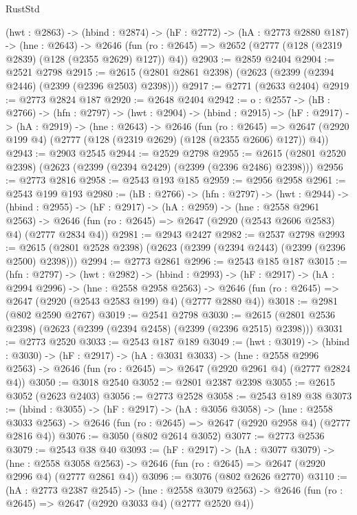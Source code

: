 \begin{lexlean}{RustStd}
\begin{coremodule}
{\begin{coremodule}
{{{{{  (hwt : @2863) ->
  (hbind : @2874) ->
  (hF : @2772) ->
  (hA : @2773 @2880 @187) ->
  (hne : @2643) ->
  @2646 (fun (ro : @2645) => @2652 (@2777 (@128 (@2319 @2839) (@128 (@2355 @2629) @127)) @4))
@2903 := @2859 @2404
@2904 := @2521 @2798
@2915 := @2615 (@2801 @2861 @2398) (@2623 (@2399 (@2394 @2446) (@2399 (@2396 @2503) @2398)))
@2917 := @2771 (@2633 @2404)
@2919 := @2773 @2824 @187
@2920 := @2648 @2404
@2942 := {o : @2557} ->
  (hB : @2766) ->
  (hfn : @2797) ->
  (hwt : @2904) ->
  (hbind : @2915) ->
  (hF : @2917) ->
  (hA : @2919) ->
  (hne : @2643) ->
  @2646
    (fun (ro : @2645) =>
    @2647 (@2920 @199 @4) (@2777 (@128 (@2319 @2629) (@128 (@2355 @2606) @127)) @4))
@2943 := @2903 @2545
@2944 := @2529 @2798
@2955 := @2615 (@2801 @2520 @2398) (@2623 (@2399 (@2394 @2429) (@2399 (@2396 @2486) @2398)))
@2956 := @2773 @2816
@2958 := @2543 @193 @185
@2959 := @2956 @2958
@2961 := @2543 @199 @193
@2980 := (hB : @2766) ->
  (hfn : @2797) ->
  (hwt : @2944) ->
  (hbind : @2955) ->
  (hF : @2917) ->
  (hA : @2959) ->
  (hne : @2558 @2961 @2563) ->
  @2646 (fun (ro : @2645) => @2647 (@2920 (@2543 @2606 @2583) @4) (@2777 @2834 @4))
@2981 := @2943 @2427
@2982 := @2537 @2798
@2993 := @2615 (@2801 @2528 @2398) (@2623 (@2399 (@2394 @2443) (@2399 (@2396 @2500) @2398)))
@2994 := @2773 @2861
@2996 := @2543 @185 @187
@3015 := (hfn : @2797) ->
  (hwt : @2982) ->
  (hbind : @2993) ->
  (hF : @2917) ->
  (hA : @2994 @2996) ->
  (hne : @2558 @2958 @2563) ->
  @2646 (fun (ro : @2645) => @2647 (@2920 (@2543 @2583 @199) @4) (@2777 @2880 @4))
@3018 := @2981 (@802 @2590 @2767)
@3019 := @2541 @2798
@3030 := @2615 (@2801 @2536 @2398) (@2623 (@2399 (@2394 @2458) (@2399 (@2396 @2515) @2398)))
@3031 := @2773 @2520
@3033 := @2543 @187 @189
@3049 := (hwt : @3019) ->
  (hbind : @3030) ->
  (hF : @2917) ->
  (hA : @3031 @3033) ->
  (hne : @2558 @2996 @2563) -> @2646 (fun (ro : @2645) => @2647 (@2920 @2961 @4) (@2777 @2824 @4))
@3050 := @3018 @2540
@3052 := @2801 @2387 @2398
@3055 := @2615 @3052 (@2623 @2403)
@3056 := @2773 @2528
@3058 := @2543 @189 @38
@3073 := (hbind : @3055) ->
  (hF : @2917) ->
  (hA : @3056 @3058) ->
  (hne : @2558 @3033 @2563) -> @2646 (fun (ro : @2645) => @2647 (@2920 @2958 @4) (@2777 @2816 @4))
@3076 := @3050 (@802 @2614 @3052)
@3077 := @2773 @2536
@3079 := @2543 @38 @40
@3093 := (hF : @2917) ->
  (hA : @3077 @3079) ->
  (hne : @2558 @3058 @2563) -> @2646 (fun (ro : @2645) => @2647 (@2920 @2996 @4) (@2777 @2861 @4))
@3096 := @3076 (@802 @2626 @2770)
@3110 := (hA : @2773 @2387 @2545) ->
  (hne : @2558 @3079 @2563) -> @2646 (fun (ro : @2645) => @2647 (@2920 @3033 @4) (@2777 @2520 @4))
}}}}}
\end{coremodule}}
\end{coremodule}
\end{lexlean}
